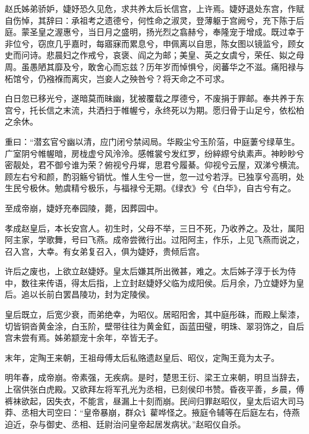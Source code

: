\documentclass[12pt,UTF8]{ctexbook}
\begin{document}
赵氏姊弟骄妒，婕妤恐久见危，求共养太后长信宫，上许焉。婕妤退处东宫，作赋自伤悼，其辞曰：承祖考之遗德兮，何性命之淑灵，登薄躯于宫阙兮，充下陈于后庭。蒙圣皇之渥惠兮，当日月之盛明，扬光烈之翕赫兮，奉隆宠于增成。既过幸于非位兮，窃庶几乎嘉时，每寤寐而累息兮，申佩离以自思，陈女图以镜监兮，顾女史而问诗。悲晨妇之作戒兮，哀褒、阎之为邮；美皇、英之女虞兮，荣任、姒之母周。虽愚陋其靡及兮，敢舍心而忘兹？历年岁而悼惧兮，闵蕃华之不滋。痛阳禄与柘馆兮，仍襁褓而离灾，岂妾人之殃咎兮？将天命之不可求。



白日忽已移光兮，遂暗莫而昧幽，犹被覆载之厚德兮，不废捐于罪邮。奉共养于东宫兮，托长信之末流，共洒扫于帷幄兮，永终死以为期。愿归骨于山足兮，依松柏之余休。



重曰：“潜玄官兮幽以清，应门闭兮禁闼局。华殿尘兮玉阶菭，中庭萋兮绿草生。广室阴兮帷幄暗，房栊虚兮风泠泠。感帷裳兮发红罗，纷綷縩兮纨素声。神眇眇兮密靓处，君不御兮谁为荣？俯视兮丹墀，思君兮履綦。仰视兮云屋，双涕兮横流。顾左右兮和颜，酌羽觞兮销忧。惟人生兮一世，忽一过兮若浮。已独享兮高明，处生民兮极休。勉虞精兮极乐，与福禄兮无期。《绿衣》兮《白华》，自古兮有之。



至成帝崩，婕妤充奉园陵，薨，因葬园中。



孝成赵皇后，本长安宫人。初生时，父母不举，三日不死，乃收养之。及壮，属阳阿主家，学歌舞，号曰飞燕。成帝尝微行出。过阳阿主，作乐，上见飞燕而说之，召入宫，大幸。有女弟复召入，俱为婕妤，贵倾后宫。



许后之废也，上欲立赵婕妤。皇太后嫌其所出微甚，难之。太后姊子淳于长为侍中，数往来传语，得太后指，上立封赵婕妤父临为成阳侯。后月余，乃立婕妤为皇后。追以长前白罢昌陵功，封为定陵侯。



皇后既立，后宽少衰，而弟绝幸，为昭仪。居昭阳舍，其中庭彤硃，而殿上髤漆，切皆铜沓黄金涂，白玉阶，壁带往往为黄金釭，函蓝田璧，明珠、翠羽饰之，自后宫未尝有焉。姊弟颛宠十余年，卒皆无子。



末年，定陶王来朝，王祖母傅太后私赂遗赵皇后、昭仪，定陶王竟为太子。



明年春，成帝崩。帝素强，无疾病。是时，楚思王衍、梁王立来朝，明旦当辞去，上宿供张白虎殿。又欲拜左将军孔光为丞相，已刻侯印书赞。昏夜平善，乡晨，傅裤袜欲起，因失衣，不能言，昼漏上十刻而崩。民间归罪赵昭仪，皇太后诏大司马莽、丞相大司空曰：“皇帝暴崩，群众讠雚哗怪之。掖庭令辅等在后庭左右，侍燕迫近，杂与御史、丞相、廷尉治问皇帝起居发病状。”赵昭仪自杀。
\end{document}
